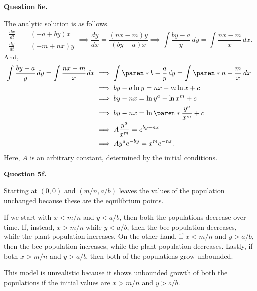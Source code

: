 \documentclass[11pt]{penrose}
\newenvironment{problem}[2][Question]{\textbf{#1 #2.}\par}{}
\begin{document}
\begin{problem}{5e}
    The analytic solution is as follows.
    \begin{equation*}
        \begin{aligned}
            \frac{dx}{dt} &= (-a + by)x\\
            \frac{dy}{dt} &= (-m + nx)y
        \end{aligned}
        \implies
        \frac{dy}{dx} = \frac{(nx - m)y}{(by - a)x}
        \implies
        \int \frac{by - a}{y} \,dy = \int \frac{nx - m}{x} \,dx.
    \end{equation*}
    And,
    \begin{align*}
        \int \frac{by - a}{y} \,dy = \int \frac{nx - m}{x} \,dx
        &\implies \int \paren*{b - \frac{a}{y}} \,dy = \int \paren*{n - \frac{m}{x}} \,dx\\
        &\implies by - a\ln y = nx - m\ln x + c\\
        &\implies by - nx = \ln y^{a} - \ln x^{m} + c\\
        &\implies by - nx = \ln \paren*{\frac{y^{a}}{x^{m}}} + c\\
        &\implies A \frac{y^{a}}{x^{m}} = e^{by - nx}\\
        &\implies A y^{a} e^{-by} = x^{m} e^{-nx}.
    \end{align*}
    Here, $A$ is an arbitrary constant, determined by the initial conditions.
\end{problem}

\begin{problem}{5f}
    Starting at $(0,0)$ and $(m/n, a/b)$ leaves the values of the population unchanged because these are the equilibrium points.

    If we start with $x < m/n$ and $y < a/b$, then both the populations decrease over time. If, instead, $x > m/n$ while $y < a/b$, then the bee population decreases, while the plant population increases. On the other hand, if $x < m/n$ and $y > a/b$, then the bee population increases, while the plant population decreases. Lastly, if both $x > m/n$ and $y > a/b$, then both of the populations grow unbounded.

    This model is unrealistic because it shows unbounded growth of both the populations if the initial values are $x > m/n$ and $y > a/b$.
\end{problem}
\end{document}
